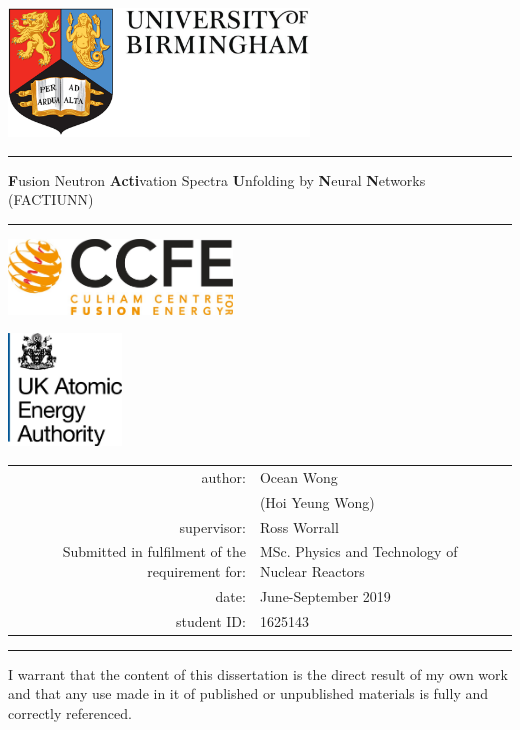\documentclass[a4paper, 12pt]{article}
\begin{document}
\centering

\includegraphics[width=8cm]{CoverPage/UoBlogo.pdf}
\hrule
\bigbreak
\textbf{F}usion Neutron \textbf{Acti}vation Spectra \textbf{U}nfolding by \textbf{N}eural \textbf{N}etworks \\
(FACTIUNN)                                      \\
\hrule
\bigbreak
\begin{minipage}[b]{0.4\textwidth}
    \includegraphics[height=2cm]{CoverPage/CCFElogo.jpeg}
  \end{minipage}
  \hfill
  \begin{minipage}[b]{0.4\textwidth}
    \includegraphics[height=3cm]{CoverPage/UKAEAlogo.jpeg}
\end{minipage}
    
\begin{table}[!h]
\centering
\begin{tabular}{rl}
author:&Ocean Wong          \\
       &(Hoi Yeung Wong)    \\
supervisor:&Ross Worrall    \\
Submitted in fulfilment of the requirement for:& MSc. Physics and Technology of Nuclear Reactors \\
date:  &June-September 2019 \\
student ID:& 1625143        \\
\end{tabular}
\end{table}
\hrule
\bigbreak
I warrant that the content of this dissertation is the direct result of my own work and that any use made in it of published or unpublished materials is fully and correctly referenced.
\end{document}
